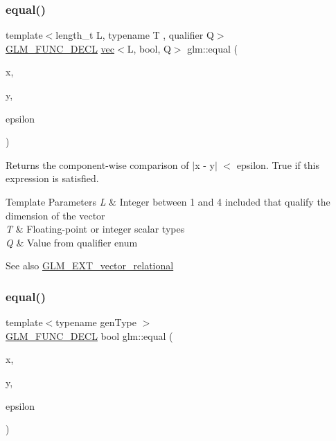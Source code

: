 \subsubsection{\texorpdfstring{equal()}{equal()}\hspace{0.1cm}{\footnotesize\ttfamily [2/3]}}
{\footnotesize\ttfamily template$<$length\+\_\+t L, typename T , qualifier Q$>$ \\
\mbox{\hyperlink{setup_8hpp_ab2d052de21a70539923e9bcbf6e83a51}{G\+L\+M\+\_\+\+F\+U\+N\+C\+\_\+\+D\+E\+CL}} \mbox{\hyperlink{structglm_1_1vec}{vec}}$<$L, bool, Q$>$ glm\+::equal (\begin{DoxyParamCaption}\item[{\mbox{\hyperlink{structglm_1_1vec}{vec}}$<$ L, T, Q $>$ const \&}]{x,  }\item[{\mbox{\hyperlink{structglm_1_1vec}{vec}}$<$ L, T, Q $>$ const \&}]{y,  }\item[{\mbox{\hyperlink{structglm_1_1vec}{vec}}$<$ L, T, Q $>$ const \&}]{epsilon }\end{DoxyParamCaption})}

Returns the component-\/wise comparison of $\vert$x -\/ y$\vert$ $<$ epsilon. True if this expression is satisfied.


\begin{DoxyTemplParams}{Template Parameters}
{\em L} & Integer between 1 and 4 included that qualify the dimension of the vector \\
\hline
{\em T} & Floating-\/point or integer scalar types \\
\hline
{\em Q} & Value from qualifier enum\\
\hline
\end{DoxyTemplParams}
\begin{DoxySeeAlso}{See also}
\mbox{\hyperlink{group__ext__vector__relational}{G\+L\+M\+\_\+\+E\+X\+T\+\_\+vector\+\_\+relational}} 
\end{DoxySeeAlso}
\mbox{\label{group__ext__vector__relational_gac4ae021e79693174e4de6560d159b33a}} 
\subsubsection{\texorpdfstring{equal()}{equal()}\hspace{0.1cm}{\footnotesize\ttfamily [3/3]}}
{\footnotesize\ttfamily template$<$typename gen\+Type $>$ \\
\mbox{\hyperlink{setup_8hpp_ab2d052de21a70539923e9bcbf6e83a51}{G\+L\+M\+\_\+\+F\+U\+N\+C\+\_\+\+D\+E\+CL}} bool glm\+::equal (\begin{DoxyParamCaption}\item[{gen\+Type const \&}]{x,  }\item[{gen\+Type const \&}]{y,  }\item[{gen\+Type const \&}]{epsilon }\end{DoxyParamCaption})}

